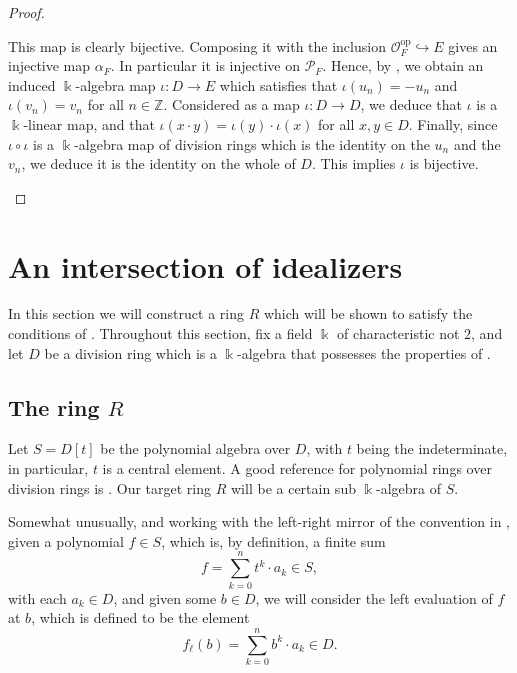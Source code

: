 \documentclass{amsart}
\theoremstyle{definition}
\newcommand{\inj}{\hookrightarrow}
\newcommand{\opn}{\operatorname}
\renewcommand{\k}{\Bbbk}
\numberwithin{equation}{section}
\begin{document}
\begin{proof}
\begin{enumerate}
This map is clearly bijective. Composing it with the inclusion $\mathcal{O}_F^{\opn{op}} \inj E$ gives an injective map $\alpha_F$.
In particular it is injective on $\mathcal{P}_F$.
Hence, by ,
we obtain an induced $\k$-algebra map $\iota:D \to E$ which satisfies that $\iota(u_n) = -u_n$ and $\iota(v_n) = v_n$ for all $n \in \mathbb{Z}$. 
Considered as a map $\iota:D\to D$,
we deduce that $\iota$ is a $\k$-linear map,
and that $\iota(x\cdot y) = \iota(y)\cdot \iota(x)$ for all $x,y \in D$.
Finally, since $\iota\circ \iota$ is a $\k$-algebra map of division rings which is the identity on the $u_n$ and the $v_n$,
we deduce it is the identity on the whole of $D$.
This implies $\iota$ is bijective.
\end{enumerate}
\end{proof}

\section{An intersection of idealizers}\label{sec:R}

In this section we will construct a ring $R$ which will be shown to satisfy the conditions of .
Throughout this section, fix a field $\k$ of characteristic not $2$,
and let $D$ be a division ring which is a $\k$-algebra that possesses the properties of .

\subsection{The ring $R$}
Let $S = D[t]$ be the polynomial algebra over $D$,
with $t$ being the indeterminate, in particular, $t$ is a central element.
A good reference for polynomial rings over division rings is \cite[Section 16]{Lam}. 
Our target ring $R$ will be a certain sub $\k$-algebra of $S$.

Somewhat unusually, and working with the left-right mirror of the convention in \cite{Lam},
given a polynomial $f \in S$,
which is, by definition, a finite sum
\[
f = \sum_{k=0}^n t^k \cdot a_k \in S,
\]
with each $a_k \in D$, 
and given some $b \in D$,
we will consider the left evaluation of $f$ at $b$,
which is defined to be the element
\[
f_{\ell}(b) = \sum_{k=0}^n b^k \cdot a_k \in D.
\]
\end{document}
